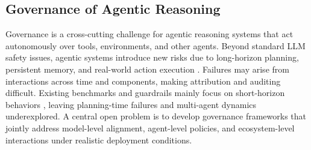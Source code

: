 \subsection{Governance of Agentic Reasoning}
Governance is a cross-cutting challenge for agentic reasoning systems that act autonomously over tools, environments, and other agents. Beyond standard LLM safety issues, agentic systems introduce new risks due to long-horizon planning, persistent memory, and real-world action execution \citep{wang2025comprehensive}. Failures may arise from interactions across time and components, making attribution and auditing difficult. Existing benchmarks and guardrails mainly focus on short-horizon behaviors \citep{zhen2024guardagent,tongxin2024rjudge}, leaving planning-time failures and multi-agent dynamics underexplored. A central open problem is to develop governance frameworks that jointly address model-level alignment, agent-level policies, and ecosystem-level interactions under realistic deployment conditions.